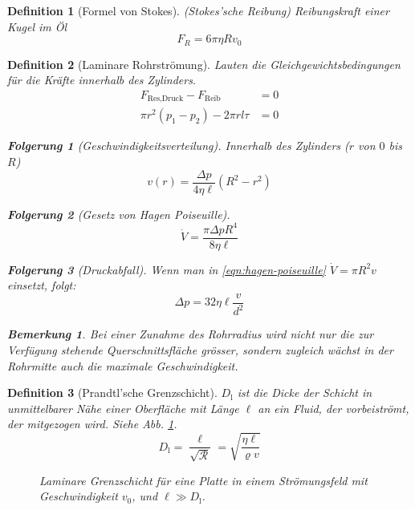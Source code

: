 \documentclass[a4paper, twocolumn]{article}
\numberwithin{equation}{section}
\theoremstyle{hsr-def}
\newtheorem{definition}{Definition}[section]
\theoremstyle{hsr-sub}
\newtheorem{result}{Folgerung}[definition]
\newtheorem{remark}{Bemerkung}[definition]
\begin{document}
\begin{definition}[Formel von Stokes]
(Stokes'sche Reibung) Reibungskraft einer Kugel im \"Ol 
\[
    F_R = 6\pi\eta Rv_0
\]
\end{definition}

\begin{definition}[Laminare Rohrstr\"omung]
Lauten die Gleichgewichtsbedingungen f\"ur die Kr\"afte innerhalb des Zylinders.
\begin{align*}
    F_\text{Res,Druck} - F_\text{Reib} & = 0 \\
    \pi r^2 (p_1 - p_2) - 2\pi rl\tau &= 0
\end{align*}

\begin{result}[Geschwindigkeitsverteilung] 
Innerhalb des Zylinders (\(r\) von \(0\) bis \(R\))
\[
    v(r) = \frac{\Delta p}{4\eta\ell}\left(R^2-r^2\right)
\]
\end{result}

\begin{result}[Gesetz von Hagen Poiseuille]
\begin{equation} \label{eqn:hagen-poiseuille}
    \dot{V} = \frac{\pi\Delta p R^4}{8\eta\ell}
\end{equation}
\end{result}

\begin{result}[Druckabfall]
Wenn man in \eqref{eqn:hagen-poiseuille} \(\dot{V} = \pi R^2 v\) einsetzt, folgt:
\[
    \Delta p = 32\eta\ell \frac{v}{d^2}
\]
\end{result}

\begin{remark}
Bei einer Zunahme des Rohrradius wird nicht nur die zur Verf\"ugung stehende Querschnittsfl\"ache gr\"osser, sondern zugleich w\"achst in der Rohrmitte auch die maximale Geschwindigkeit.
\end{remark}
\end{definition}

\begin{definition}[Prandtl'sche Grenzschicht]
\(D_\text{l}\) ist die Dicke der Schicht in unmittelbarer N\"ahe einer Oberfl\"ache mit L\"ange \(\ell\) an ein Fluid, der vorbeistr\"omt, der mitgezogen wird. Siehe Abb. \ref{fig:prandtl-boundary}.
\[
    D_\text{l} = \frac{\ell}{\sqrt{\mathcal{R}}} =  \sqrt{\frac{\eta\ell}{\varrho v}}
\]
\begin{figure}[h] \centering

\caption{Laminare Grenzschicht f\"ur eine Platte in einem Str\"omungsfeld mit Geschwindigkeit \(v_0\), und \(\ell \gg D_\text{l}\).}
\label{fig:prandtl-boundary}
\end{figure}
\end{definition}
\end{document}
